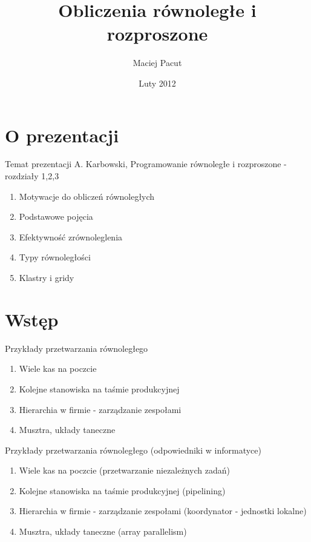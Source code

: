 \documentclass{beamer}
\title{Obliczenia równoległe i rozproszone}
\author{Maciej Pacut}
\date{Luty 2012}
\begin{document}
\section{O prezentacji}

\begin{frame}
  \titlepage
\end{frame}

\begin{frame}{Temat prezentacji}
  A. Karbowski, Programowanie równoległe i rozproszone - rozdziały 1,2,3
  \begin{enumerate}
  \item Motywacje do obliczeń równoległych
  \item Podstawowe pojęcia
  \item Efektywność zrównoleglenia
  \item Typy równoległości
  \item Klastry i gridy
  \end{enumerate}
\end{frame}

\section{Wstęp}

\begin{frame}{Przykłady przetwarzania równoległego}
  \begin{enumerate}
  \item Wiele kas na poczcie
  \item Kolejne stanowiska na taśmie produkcyjnej
  \item Hierarchia w firmie - zarządzanie zespołami
  \item Musztra, układy taneczne
  \end{enumerate}
\end{frame}

\begin{frame}{Przykłady przetwarzania równoległego (odpowiedniki w informatyce)}
  \begin{enumerate}
  \item Wiele kas na poczcie (przetwarzanie niezależnych zadań)
  \item Kolejne stanowiska na taśmie produkcyjnej (pipelining)
  \item Hierarchia w firmie - zarządzanie zespołami (koordynator - jednostki lokalne)
  \item Musztra, układy taneczne (array parallelism)
  \end{enumerate}
\end{frame}
\end{document}
